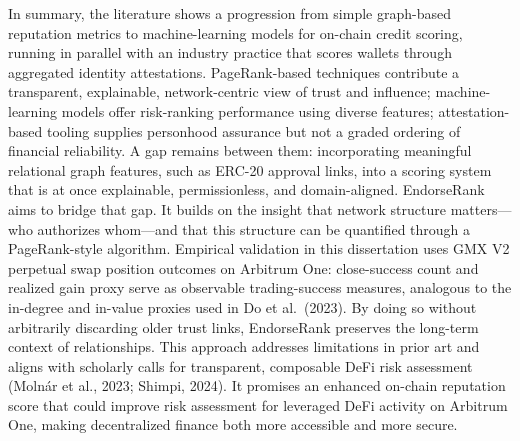 In summary, the literature shows a progression from simple graph-based reputation metrics to machine-learning models for on-chain credit scoring, running in parallel with an industry practice that scores wallets through aggregated identity attestations. PageRank-based techniques contribute a transparent, explainable, network-centric view of trust and influence; machine-learning models offer risk-ranking performance using diverse features; attestation-based tooling supplies personhood assurance but not a graded ordering of financial reliability. A gap remains between them: incorporating meaningful relational graph features, such as ERC-20 approval links, into a scoring system that is at once explainable, permissionless, and domain-aligned. EndorseRank aims to bridge that gap. It builds on the insight that network structure matters---who authorizes whom---and that this structure can be quantified through a PageRank-style algorithm. Empirical validation in this dissertation uses GMX V2 perpetual swap position outcomes on Arbitrum One: close-success count and realized gain proxy serve as observable trading-success measures, analogous to the in-degree and in-value proxies used in Do et al.\ (2023). By doing so without arbitrarily discarding older trust links, EndorseRank preserves the long-term context of relationships. This approach addresses limitations in prior art and aligns with scholarly calls for transparent, composable DeFi risk assessment (Moln\'{a}r et al., 2023; Shimpi, 2024). It promises an enhanced on-chain reputation score that could improve risk assessment for leveraged DeFi activity on Arbitrum One, making decentralized finance both more accessible and more secure.
